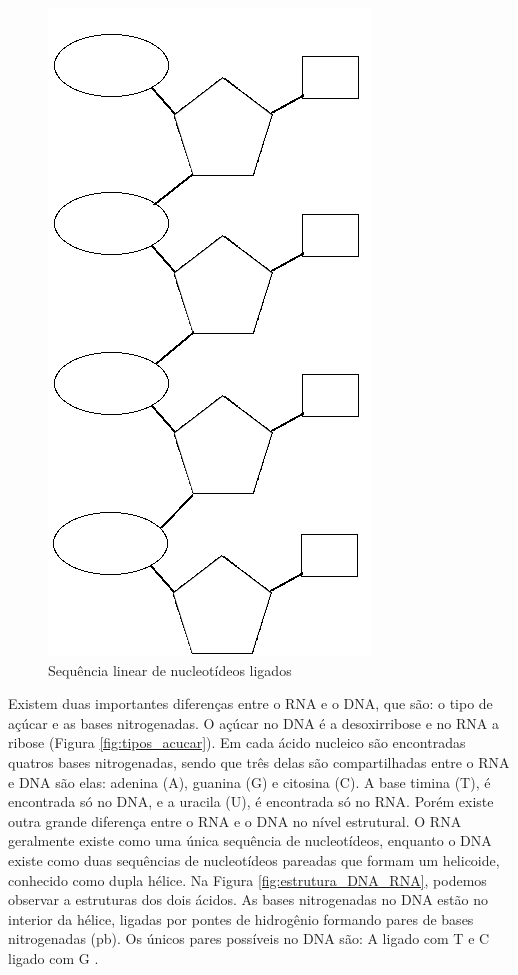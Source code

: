 \begin{figure}[htb!]
    \centering
    \includegraphics[scale=0.5]{./figuras/sequencia_nucleotideo.png}
    \caption{Sequência linear de nucleotídeos ligados}
    \label{fig:sequencia_nucleotideo}
\end{figure}

Existem duas importantes diferenças entre o RNA e o DNA, que são: o tipo de açúcar e as bases nitrogenadas. O açúcar no DNA é a desoxirribose e no RNA a ribose (Figura \ref{fig:tipos_acucar}). Em cada ácido nucleico são encontradas quatros bases nitrogenadas, sendo que três delas são compartilhadas entre o RNA e DNA são elas: adenina (A), guanina (G) e citosina (C). A base timina (T), é encontrada só no DNA, e a uracila (U), é encontrada só no RNA. Porém existe outra grande diferença entre o RNA e o DNA no nível estrutural. O RNA geralmente existe como uma única sequência de nucleotídeos, enquanto o DNA existe como duas sequências de nucleotídeos pareadas que formam um helicoide, conhecido como dupla hélice. Na Figura \ref{fig:estrutura_DNA_RNA}, podemos observar a estruturas dos dois ácidos. As bases nitrogenadas no DNA estão no interior da hélice, ligadas por pontes de hidrogênio formando pares de bases nitrogenadas (pb). Os únicos pares possíveis no DNA são: A ligado com T e C ligado com G \cite{Zaha2000}.

